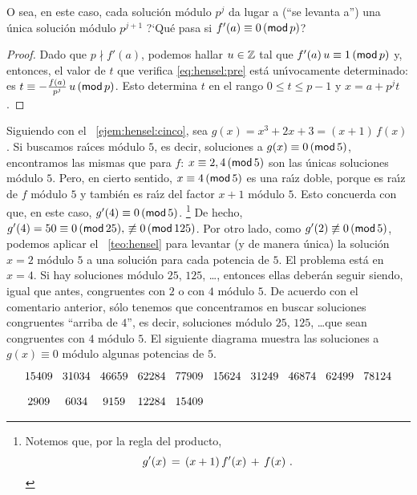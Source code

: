 O sea, en este caso, cada soluci\'on m\'odulo $p^j$ da lugar a
(``se levanta a'') una \'unica soluci\'on m\'odulo $p^{j+1}$
?`Qu\'e pasa si $f'(a)\equiv 0\tmodulo[p]$?

\begin{proof}
	Dado que $p\nmid f'(a)$, podemos hallar $u\in\Enteros$
	tal que $f'(a)\,u\equiv 1\tmodulo[p]$ y, entonces,
	el valor de $t$ que verifica \eqref{eq:hensel:pre} est\'a
	un\'{\i}vocamente determinado: es
	$t\equiv -\frac{f(a)}{p^j}\,u\tmodulo[p]$.
	Esto determina $t$ en el rango $0\leq t\leq p-1$ y
	$x=a+p^jt$.
\end{proof}

\begin{ejemHensel}\label{ejem:hensel:cinco:singular}
	Siguiendo con el \ejemname~\ref{ejem:hensel:cinco},
	sea $g(x)=x^3+2x+3=(x+1)\,f(x)$.
	Si buscamos ra\'{\i}ces m\'odulo $5$, es decir,
	soluciones a $g(x)\equiv 0\tmodulo[5]$, encontramos
	las mismas que para $f$: $x\equiv 2,4\tmodulo[5]$ son
	las \'unicas soluciones m\'odulo $5$. Pero, en cierto
	sentido, $x\equiv 4\tmodulo[5]$ es una ra\'{\i}z doble,
	porque es ra\'{\i}z de $f$ m\'odulo $5$ y tambi\'en es
	ra\'{\i}z del factor $x+1$ m\'odulo $5$.
	Esto concuerda con que, en este caso, $g'(4)\equiv 0\tmodulo[5]$.%
	\footnote{
		Notemos que, por la regla del producto,
		\begin{displaymath}
			g'(x)\,=\,(x+1)\,f'(x)\,+\,f(x)
			\dispstop
		\end{displaymath}
	}
	De hecho, $g'(4)=50\equiv 0\tmodulo[25],\,\not\equiv 0\tmodulo[125]$.
	Por otro lado, como $g'(2)\not\equiv 0\tmodulo[5]$,
	podemos aplicar el \teoname~\ref{teo:hensel} para levantar (y de
	manera \'unica) la soluci\'on $x=2$ m\'odulo $5$ a una soluci\'on
	para cada potencia de $5$. El problema est\'a en $x=4$.
	Si hay soluciones m\'odulo $25$, $125$, \dots, entonces ellas
	deber\'an seguir siendo, igual que antes, congruentes con
	$2$ o con $4$ m\'odulo $5$. De acuerdo con el comentario
	anterior, s\'olo tenemos que concentramos en buscar
	soluciones congruentes ``arriba de $4$'', es decir,
	soluciones m\'odulo $25$, $125$, \dots que sean congruentes
	con $4$ m\'odulo $5$.
	El siguiente diagrama muestra las soluciones a $g(x)\equiv 0$
	m\'odulo algunas potencias de $5$.
	\begin{displaymath}
		\begin{tikzcd}[column sep=.01pt, row sep=small]
			& 15409 & 31034 & 46659 & 62284 & 77909 & &
				& 15624 & 31249 & 46874 & 62499 & 78124 \\
			& 2909 & 6034 & 9159 & 12284 & 15409

\end{tikzcd}
\end{displaymath}
\end{ejemHensel}
